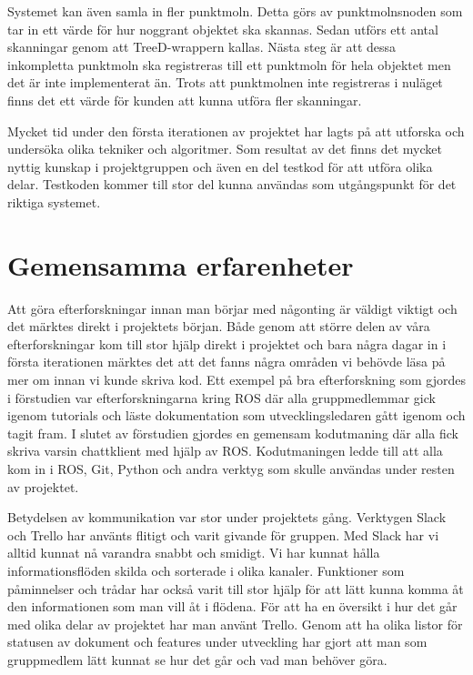 Systemet kan även samla in fler punktmoln. Detta görs av punktmolnsnoden som tar in ett värde för hur noggrant objektet ska skannas. Sedan utförs ett antal skanningar genom att TreeD-wrappern kallas. Nästa steg är att dessa inkompletta punktmoln ska registreras till ett punktmoln för hela objektet men det är inte implementerat än. Trots att punktmolnen inte registreras i nuläget finns det ett värde för kunden att kunna utföra fler skanningar.

Mycket tid under den första iterationen av projektet har lagts på att utforska och undersöka olika tekniker och algoritmer. Som resultat av det finns det mycket nyttig kunskap i projektgruppen och även en del testkod för att utföra olika delar. Testkoden kommer till stor del kunna användas som utgångspunkt för det riktiga systemet.


\section{Gemensamma erfarenheter}

Att göra efterforskningar innan man börjar med någonting är väldigt viktigt och det märktes direkt i projektets början. Både genom att större delen av våra efterforskningar kom till stor hjälp direkt i projektet och bara några dagar in i första iterationen märktes det att det fanns några områden vi behövde läsa på mer om innan vi kunde skriva kod. Ett exempel på bra efterforskning som gjordes i förstudien var efterforskningarna kring ROS där alla gruppmedlemmar gick igenom tutorials och läste dokumentation som utvecklingsledaren gått igenom och tagit fram. I slutet av förstudien gjordes en gemensam kodutmaning där alla fick skriva varsin chattklient med hjälp av ROS. Kodutmaningen ledde till att alla kom in i ROS, Git, Python och andra verktyg som skulle användas under resten av projektet.

Betydelsen av kommunikation var stor under projektets gång. Verktygen Slack och Trello har använts flitigt och varit givande för gruppen. Med Slack har vi alltid kunnat nå varandra snabbt och smidigt. Vi har kunnat hålla informationsflöden skilda och sorterade i olika kanaler. Funktioner som påminnelser och trådar har också varit till stor hjälp för att lätt kunna komma åt den informationen som man vill åt i flödena. För att ha en översikt i hur det går med olika delar av projektet har man använt Trello. Genom att ha olika listor för statusen av dokument och features under utveckling har gjort att man som gruppmedlem lätt kunnat se hur det går och vad man behöver göra. 

